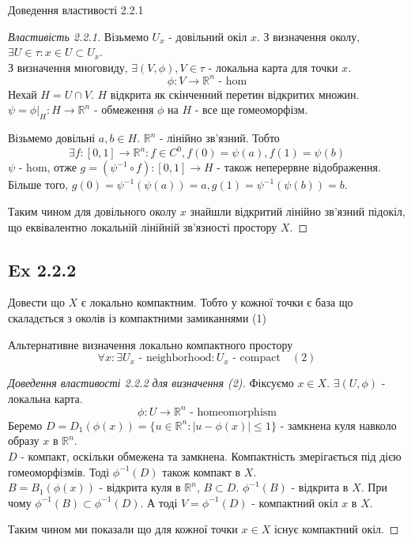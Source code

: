 \documentclass[10pt, a4paper]{article} %
\newcommand{\R}{\mathbb{R}}
\begin{document}
Доведення властивості 2.2.1
\begin{proof}[Властивість 2.2.1]
    Візьмемо $U_x$ - довільний окіл $x$.
    З визначення околу, $\exists U \in \tau: x \in U \subset U_x$.\\
    З визначення многовиду, $\exists (V,\phi), V \in \tau$ - локальна карта для точки $x$.
    \[\phi:V \to \R^n \text{ - hom}\]
    Нехай $H = U \cap V$. $H$ відкрита як скінченний перетин відкритих множин.  
    $\psi = \phi|_H : H \to \R^n$ - обмеження $\phi$ на $H$ - все ще гомеоморфізм.  

    Візьмемо довільні $a,b \in H$. 
    $\R^n$ - лінійно зв'язний. Тобто 
    \[\exists f: [0,1] \to \R^n: f\in C^0, f(0)=\psi(a), f(1)=\psi(b)\]
    $\psi$ - hom, отже $g = \left(\psi^{-1} \circ f\right) : [0,1] \to H$ - також неперервне відображення.  
    Більше того, $g(0) = \psi^{-1}(\psi(a)) = a, g(1) = \psi^{-1}(\psi(b)) = b$.
    
    Таким чином для довільного околу $x$ знайшли відкритий лінійно зв'язний підокіл, 
    що еквівалентно локальній лінійній зв'язності простору $X$.
\end{proof}

\subsection*{Ex 2.2.2}
\begin{mdframed}
    Довести що $X$ є локально компактним. Тобто у кожної точки є база що скаладється з околів із компактними замиканнями (1)
\end{mdframed}

Альтернативне визначення локально компактного простору
\[\forall x: \exists U_x \text{ - neighborhood}: U_x \text{ - compact} \quad (2)\]

\begin{proof}[Доведення властивості 2.2.2 для визначення (2)]
    Фіксуємо $x\in X$.
    $\exists (U,\phi)$ - локальна карта.
    \[\phi : U \to \R^n \text{ - homeomorphism}\]
    Беремо $D = D_1(\phi(x)) = \{u \in \R^n: |u-\phi(x)|\le 1\}$ - замкнена куля навколо образу $x$ в $\R^n$.\\
    $D$ - компакт, оскільки обмежена та замкнена. Компактність змерігається під дією гомеоморфізмів.
    Тоді $\phi^{-1}(D)$ також компакт в $X$.\\
    $B = B_1(\phi(x))$ - відкрита куля в $\R^n$, $B \subset D$.
    $\phi^{-1}(B)$ - відкрита в $X$. При чому $\phi^{-1}(B) \subset \phi^{-1}(D)$.
    А тоді $V = \phi^{-1}(D)$ - компактний окіл $x$ в $X$.
    
    Таким чином ми показали що для кожної точки $x\in X$ існує компактний окіл.
\end{proof}
\end{document}
